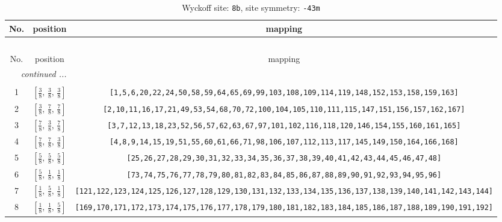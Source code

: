 \documentclass[fleqn,8pt]{jsarticle}
\begin{document}
\renewcommand{\arraystretch}{1.2}
\begin{longtable}{ccc}
\caption{Wyckoff site: {\tt 8b}, site symmetry: {\tt -43m}}
 \\
 \hline \hline
No. & position & mapping \\ \hline \endfirsthead

\multicolumn{2}{l}{\tablename\ \thetable{}} \\
 \hline \hline
No. & position & mapping \\ \hline \endhead

 \hline \hline
\multicolumn{2}{r}{\footnotesize\it continued ...} \\ \endfoot

 \hline \hline
\multicolumn{2}{r}{} \\ \endlastfoot

1 & $\left[ \frac{3}{8},\, \frac{3}{8},\, \frac{3}{8} \right]$ & {\tt [1,5,6,20,22,24,50,58,59,64,65,69,99,103,108,109,114,119,148,152,153,158,159,163]} \\ \hline
2 & $\left[ \frac{3}{8},\, \frac{7}{8},\, \frac{7}{8} \right]$ & {\tt [2,10,11,16,17,21,49,53,54,68,70,72,100,104,105,110,111,115,147,151,156,157,162,167]} \\ \hline
3 & $\left[ \frac{7}{8},\, \frac{3}{8},\, \frac{7}{8} \right]$ & {\tt [3,7,12,13,18,23,52,56,57,62,63,67,97,101,102,116,118,120,146,154,155,160,161,165]} \\ \hline
4 & $\left[ \frac{7}{8},\, \frac{7}{8},\, \frac{3}{8} \right]$ & {\tt [4,8,9,14,15,19,51,55,60,61,66,71,98,106,107,112,113,117,145,149,150,164,166,168]} \\ \hline
5 & $\left[ \frac{5}{8},\, \frac{5}{8},\, \frac{5}{8} \right]$ & {\tt [25,26,27,28,29,30,31,32,33,34,35,36,37,38,39,40,41,42,43,44,45,46,47,48]} \\ \hline
6 & $\left[ \frac{5}{8},\, \frac{1}{8},\, \frac{1}{8} \right]$ & {\tt [73,74,75,76,77,78,79,80,81,82,83,84,85,86,87,88,89,90,91,92,93,94,95,96]} \\ \hline
7 & $\left[ \frac{1}{8},\, \frac{5}{8},\, \frac{1}{8} \right]$ & {\tt [121,122,123,124,125,126,127,128,129,130,131,132,133,134,135,136,137,138,139,140,141,142,143,144]} \\ \hline
8 & $\left[ \frac{1}{8},\, \frac{1}{8},\, \frac{5}{8} \right]$ & {\tt [169,170,171,172,173,174,175,176,177,178,179,180,181,182,183,184,185,186,187,188,189,190,191,192]} \\
\end{longtable}
\renewcommand{\arraystretch}{1.2}
\end{document}
